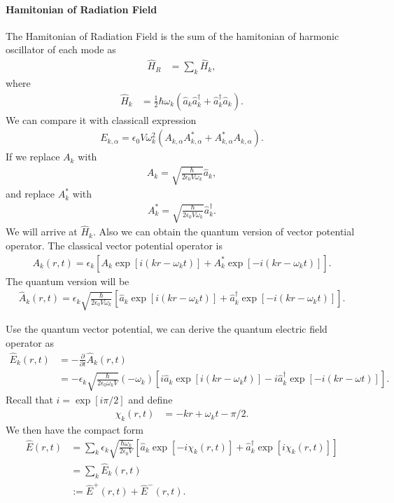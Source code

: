 \documentclass[../../note.tex]{subfiles}
\begin{document}
\paragraph{Hamitonian of Radiation Field}
The Hamitonian of Radiation Field is the sum of the hamitonian of harmonic oscillator of each mode as
\begin{align}
    \hat{H}_R
    &= \sum_k \hat{H}_k,
\end{align}
where 
\begin{align}
    \hat{H}_k
    &=\frac{1}{2} \hbar \omega_k\left(\hat{a}_k \hat{a}_k^\dagger + \hat{a}_k^\dagger \hat{a}_k \right).
\end{align}
We can compare it with classicall expression
\begin{align}
    E_{k,\alpha} = \epsilon_0 V \omega_k^2 \left(A_{k,\alpha} A_{k,\alpha}^\ast + A_{k,\alpha}^\ast A_{k,\alpha}\right).
\end{align}
If we replace $A_k$ with
\begin{align}
    A_k = \sqrt{\frac{\hbar}{2 \epsilon_0 V \omega_k} }\hat{a}_k,
\end{align}
and replace $A_k^\ast$ with
\begin{align}
    A_k^\ast = \sqrt{\frac{\hbar}{2 \epsilon_0 V \omega_k} }\hat{a}_k^\dagger.
\end{align}
We will arrive at $\hat{H}_k$. Also we can obtain the quantum version of vector potential operator. The classical vector potential operator is
\begin{align}
    A_{k}(r,t) = \epsilon_k\left[A_k \exp[i(kr-\omega_k t)] + A_k^\ast \exp[-i(kr-\omega_k t)] \right].
\end{align}
The quantum version will be
\begin{align}
    \hat{A}_{k}(r,t) = \epsilon_k \sqrt{\frac{\hbar}{2 \epsilon_0 V \omega_k} } \left[\hat{a}_k \exp[i(kr-\omega_k t)] + \hat{a}_k^\dagger \exp[-i(kr-\omega_k t)] \right].
\end{align}

Use the quantum vector potential, we can derive the quantum electric field operator as
\begin{align}
    \hat{E}_k(r,t) 
    &= - \frac{\partial}{\partial t} \hat{A}_k(r,t) \\
    &= - \epsilon_k \sqrt{\frac{\hbar}{2 \epsilon_0 \omega_k V}} (- \omega_k) \left[i \hat{a}_k \exp[i(kr - \omega_k t)] - i \hat{a}_k^\dagger \exp[-i(kr -\omega t)]\right].
\end{align}
Recall that $i = \exp[i \pi/2]$ and define
\begin{align}
    \chi_{k}(r,t) 
    &= -kr + \omega_k t - \pi/2.
\end{align}
We then have the compact form
\begin{align}
    \hat{E}(r,t) 
    &= \sum_k \epsilon_k \sqrt{\frac{\hbar \omega_k}{2 \epsilon_0 V}} \left[\hat{a}_k \exp[-i \chi_k(r,t)] + \hat{a}_k^\dagger \exp[i \chi_k(r,t)]\right] \\
    &= \sum_k \hat{E}_k(r,t) \\
    &:= \hat{E}^{+}(r,t) + \hat{E}^{-}(r,t).
    \label{eq: compact form}
\end{align}
\end{document}
